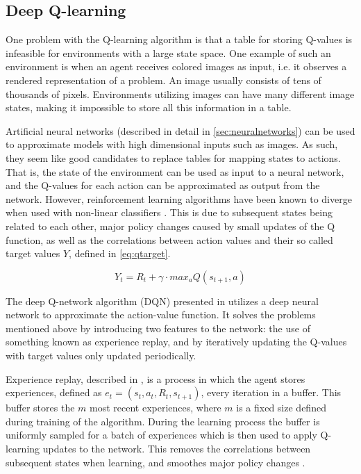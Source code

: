 \documentclass{kththesis}
\begin{document}
\subsection{Deep Q-learning}
\label{subsec:deepqlearning}
One problem with the Q-learning algorithm is that a table for storing Q-values is infeasible for environments with a large state space. One example of such an environment is when an agent receives colored images as input, i.e. it observes a rendered representation of a problem. An image usually consists of tens of thousands of pixels. Environments utilizing images can have many different image states, making it impossible to store all this information in a table.

Artificial neural networks (described in detail in \autoref{sec:neuralnetworks}) can be used to approximate models with high dimensional inputs such as images. As such, they seem like good candidates to replace tables for mapping states to actions. That is, the state of the environment can be used as input to a neural network, and the Q-values for each action can be approximated as output from the network. However, reinforcement learning algorithms have been known to diverge when used with non-linear classifiers \parencite{tsitsiklis1997analysis}. This is due to subsequent states being related to each other, major policy changes caused by small updates of the Q function, as well as the correlations between action values and their so called target values $Y$, defined in \autoref{eq:qtarget}.

\begin{equation}
\label{eq:qtarget}
Y_t = R_t + \gamma \cdot max_a Q(s_{t+1}, a)
\end{equation}

The deep Q-network algorithm (DQN) presented in \parencite{mnih2015human} utilizes a deep neural network to approximate the action-value function. It solves the problems mentioned above by introducing two features to the network: the use of something known as experience replay, and by iteratively updating the Q-values with target values only updated periodically. 

Experience replay, described in \parencite{lin1992self}, is a process in which the agent stores experiences, defined as $e_t = (s_t, a_t, R_t, s_{t+1})$, every iteration in a buffer. This buffer stores the $m$ most recent experiences, where $m$ is a fixed size defined during training of the algorithm. During the learning process the buffer is uniformly sampled for a batch of experiences which is then used to apply Q-learning updates to the network. This removes the correlations between subsequent states when learning, and smoothes major policy changes \parencite{mnih2015human}.
\end{document}
